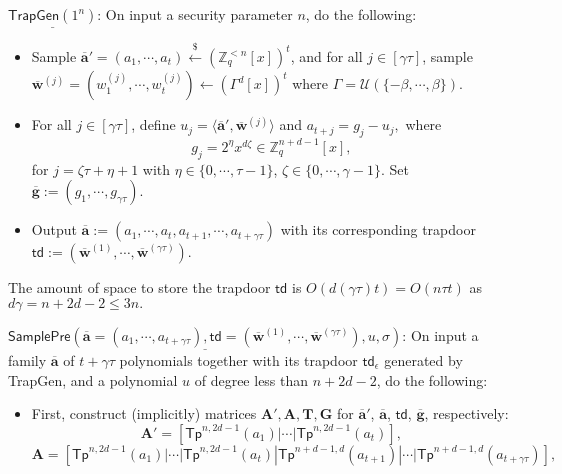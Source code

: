 \documentclass[runningheads]{llncs}
\begin{document}
\begin{description}
\item 
$\underline{\mathsf{TrapGen}(1^n)}$: On input a security parameter $n$, do the following:
\begin{itemize}
\item Sample $\overline{\mathbf{a}}'=(a_1,\cdots, a_t) \xleftarrow[]{\$} (\mathbb{Z}_q^{<n}[x])^t$, and for all $j\in [\gamma\tau]$, sample $\overline{\mathbf{w}}^{(j)}=(w^{(j)}_1, \cdots, w^{(j)}_t)\leftarrow (\Gamma^d[x])^t$ where $\Gamma=\mathcal{U}(\{-\beta,\cdots,\beta\})$.
\item For all $j\in [\gamma\tau]$, define
$u_j=\langle \overline{\mathbf{a}}',\overline{\mathbf{w}}^{(j)} \rangle$ %
and $a_{t+j}=g_j-u_j,$
 where \begin{equation}\label{k39}
 g_j=2^\eta x^{d\zeta} \in \mathbb{Z}_q^{n+d-1}[x],
 \end{equation} for $j=\zeta \tau+\eta+1$ with $\eta \in \{0,\cdots, \tau-1\}$, $\zeta \in \{0,\cdots, \gamma-1 \}$. Set $\overline{\mathbf{g}}:=(g_1,\cdots, g_{\gamma \tau})$.
 
\item Output $\overline{\mathbf{a}}:=(a_1,\cdots, a_t, a_{t+1},\cdots, a_{t+\gamma\tau})$ with its corresponding trapdoor $\mathsf{td}:=(\overline{\mathbf{w}}^{(1)}, \cdots, \overline{\mathbf{w}}^{({\gamma \tau})})$.
\end{itemize}
The amount of space to store the trapdoor $\mathsf{td}$ is $O(d(\gamma\tau)t)=O(n\tau t)$ as $d\gamma=n+2d-2 \leq 3n.$

\item 
$\underline{\mathsf{SamplePre}(\overline{\mathbf{a}}=(a_1, \cdots, a_{t+\gamma\tau}),\mathsf{td}=(\overline{\mathbf{w}}^{(1)}, \cdots, \overline{\mathbf{w}}^{({\gamma \tau})}),u,\sigma)}$: On input a family $\overline{\mathbf{a}}$ of $t+\gamma\tau$ polynomials together with its trapdoor $\mathsf{td}_{\epsilon}$ generated by \textsf{TrapGen}, and a polynomial $u$ of degree less than $n+2d-2$, do the following: 
\begin{itemize}
\item First, construct (implicitly) matrices $\textbf{A}',\textbf{A},\textbf{T}, \textbf{G}$ for $\overline{\mathbf{a}}'$, $\overline{\mathbf{a}}$, $\mathsf{td}$, $\overline{\mathbf{g}}$, respectively:
$$\mathbf{A}'=[\mathsf{Tp}^{n,2d-1}(a_1)|\cdots|\mathsf{Tp}^{n,2d-1}(a_t)],$$
	\begin{equation*}
	\mathbf{A}=[\mathsf{Tp}^{n,2d-1}(a_1)|\cdots|\mathsf{Tp}^{n,2d-1}(a_t)| \mathsf{Tp}^{n+d-1,d}(a_{t+1})|\cdots|\mathsf{Tp}^{n+d-1,d}(a_{t+\gamma \tau})],
		\end{equation*}


\end{itemize}
\end{description}
\end{document}
